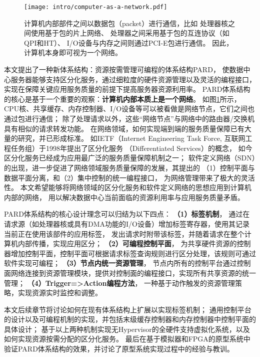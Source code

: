 \begin{figure}[H]
  \centering
  \texttt{[image: intro/computer-as-a-network.pdf]}
  \caption[计算机内部本质是一个网络]{
    计算机内部部件之间以数据包（packet）进行通信，比如
    处理器核之间使用基于包的片上网络、
    处理器之间采用基于包的互连协议（如QPI和HT）、
    I/O设备与内存之间则通过PCI-E包进行通信。
    因此，计算机本身即可视为一个网络。}
  \label{fig:computer-as-a-network}
\end{figure}

本文提出了一种新体系结构：资源按需管理可编程的体系结构PARD\cite{pard2015}，
使数据中心服务器能够支持区分化服务，通过细粒度的硬件资源管理以及灵活的编程接口，
实现在保障关键应用服务质量的前提下提高服务器资源利用率。
PARD体系结构的核心是基于一个重要的观察：\textbf{计算机内部本质上是一个网络}。
如图\ref{fig:computer-as-a-network}所示，
CPU核、共享缓存、内存控制器、I/O设备等可以被看做是网络节点，它们之间也通过包进行通信；
除了处理请求以外，这些“网络节点”与网络中的路由器/交换机具有相似的请求转发功能。
在网络领域，如何实现端到端的服务质量保障已有大量的研究，并已形成标准。
如IETF（Internet Engineering Task Force, 互联网工程任务组）于1998年提出了区分化服务
（Differentiated Services）\cite{}的概念，
如今区分化服务已经成为应用最广泛的服务质量保障机制之一；
软件定义网络（SDN）的出现，进一步促进了网络领域服务质量保障的发展，其提出的
（1）控制平面与数据平面分离，和（2）集中控制的统一编程接口，
为网络管理带来了极大的灵活性。
本文希望能够将网络领域的区分化服务和软件定义网络的思想应用到计算机内部的网络，
用以解决数据中心当前面临的资源利用率与应用服务质量矛盾。

PARD体系结构的核心设计理念可以归结为以下四点：
\textbf{（1）标签机制}，
通过在请求源（如处理器核或具有DMA功能的I/O设备）增加标签寄存器，使用其记录当前正在使用该部件的应用标签，
发出请求时附带该标签，并随着请求在整个计算机内部传播，实现应用区分；
\textbf{（2）可编程控制平面}，	%
为共享硬件资源的控制器增加控制平面，控制平面可根据请求标签查询规则进行区分处理，该规则可通过软件实现可编程；
\textbf{（3）节点内统一资源管理}，
节点内所有的控制平台通过控制面网络连接到资源管理模块，提供对控制面的编程接口，实现所有共享资源的统一管理；
\textbf{（4）Trigger=>Action编程方法}，
一种基于动作触发的资源管理策略，实现资源实时监控和调整。

本文后续章节将讨论如何在现有体系结构上扩展以实现标签机制；
通用控制平台的设计以及可编程机制的实现，并包括末级缓存控制器和内存控制器中控制平面的具体设计；
基于以上两种机制实现无Hypervisor的全硬件支持虚拟化系统，以及如何实现资源按需分配的区分化服务。
最后在基于模拟器和FPGA的原型系统中验证PARD体系结构的效果，并讨论了原型系统实现过程中的经验与教训。


